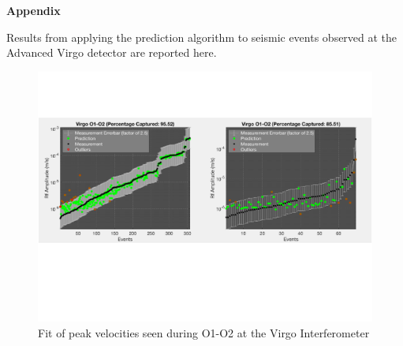 \documentclass[preprint, aps, showpacs]{revtex4-1}
\begin{document}
\textbf{Appendix}


Results from applying the prediction algorithm to seismic events observed at the Advanced Virgo detector are reported here. 

\begin{figure}[!htb]
\hspace*{-0.5cm}
 \includegraphics[width=\textwidth]{./plots/ClusteringPredictionVirgo.pdf}
 \caption{Fit of peak velocities seen during O1-O2 at the Virgo Interferometer}
 \label{fig:regression}
\end{figure}
\end{document}
